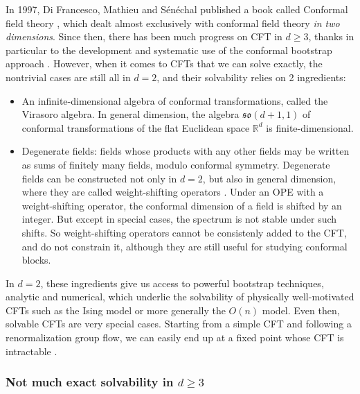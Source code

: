 \documentclass[12pt, a4paper]{article}
\begin{document}
In 1997, Di Francesco, Mathieu and Sénéchal published a book called Conformal field theory \cite{fms97}, which dealt almost exclusively with conformal field theory \textit{in two dimensions}. Since then, there has been much progress on CFT in $d\geq 3$, thanks in particular to the development and systematic use of the conformal bootstrap approach \cite{prv18}. However, when it comes to CFTs that we can solve exactly, the nontrivial cases are still all in $d=2$, and their solvability relies on 2 ingredients:
\begin{itemize}
 \item An infinite-dimensional algebra of conformal transformations, called the Virasoro algebra. In general dimension, the algebra $\mathfrak{so}(d+1,1)$ of conformal transformations of the flat Euclidean space $\mathbb{R}^d$ is finite-dimensional. 
 \item Degenerate fields: fields whose products with any other fields may be written as sums of finitely many fields, modulo conformal symmetry. Degenerate fields can be constructed not only in $d=2$, but also in general dimension, where they are called weight-shifting operators \cite{kks17}. Under an OPE with a weight-shifting operator, the conformal dimension of a field is shifted by an integer. But except in special cases, the spectrum is not stable under such shifts. So weight-shifting operators cannot be consistenly added to the CFT, and do not constrain it, although they are still useful for studying conformal blocks. 
\end{itemize}
In $d=2$, these ingredients give us access to powerful bootstrap techniques, analytic and numerical, which underlie the solvability of physically well-motivated CFTs such as the Ising model or more generally the $O(n)$ model.
Even then, solvable CFTs are very special cases. Starting from a simple CFT and following a renormalization group flow, we can easily end up at a fixed point whose CFT is intractable \cite{ab24}.


\subsubsection*{Not much exact solvability in $d\geq 3$}
\end{document}
